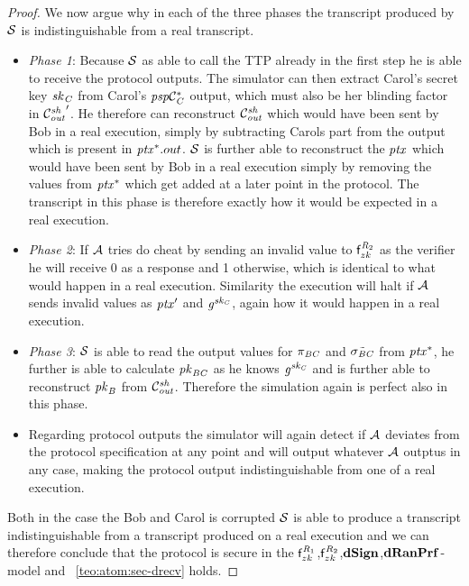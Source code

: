 \begin{proof}
    We now argue why in each of the three phases the transcript produced by $\mathcal{S}$ is indistinguishable from a real transcript.

    \begin{itemize}
        \item \textit{Phase 1}: Because $\mathcal{S}$ as able to call the TTP already in the first step he is able to receive the protocol outputs.
        The simulator can then extract Carol's secret key $\mathit{sk}_{\mathit{C}}$ from Carol's $\mathit{psp}\mathcal{C}_{\mathit{C}}^*$ output, which must also be her blinding factor in ${\mathcal{C}_{\mathit{out}}^{\mathit{sh}}}'$.
        He therefore can reconstruct $\mathcal{C}_{\mathit{out}}^{\mathit{sh}}$ which would have been sent by Bob in a real execution, simply by subtracting Carols part from the output which is present in $\mathit{ptx}^*.out$.
        $\mathcal{S}$ is further able to reconstruct the $\mathit{ptx}$ which would have been sent by Bob in a real execution simply by removing the values from $\mathit{ptx}^*$ which get added at a later point in the protocol.
        The transcript in this phase is therefore exactly how it would be expected in a real execution.
        \item \textit{Phase 2}: If $\mathcal{A}$ tries do cheat by sending an invalid value to $\mathsf{f}^{\mathit{R}_2}_{zk}$ as the verifier he will receive 0 as a response and 1 otherwise, which is identical to what would happen in a real execution.
        Similarity the execution will halt if $\mathcal{A}$ sends invalid values as ${\mathit{ptx}}'$ and $\mathit{g}^{\mathit{sk}_{\mathit{C}}}$, again how it would happen in a real execution.
        \item \textit{Phase 3}: $\mathcal{S}$ is able to read the output values for $\pi_{\mathit{B}\mathit{C}}$ and $\tilde{\sigma_{\mathit{B}\mathit{C}}}$ from $\mathit{ptx}^*$, he further is able to calculate $\mathit{pk}_{\mathit{B}\mathit{C}}$ as he knows $\mathit{g}^{\mathit{sk}_{\mathit{C}}}$ and is further able to reconstruct $\mathit{pk}_{\mathit{B}}$ from $\mathcal{C}_{\mathit{out}}^{\mathit{sh}}$.
        Therefore the simulation again is perfect also in this phase.
        \item Regarding protocol outputs the simulator will again detect if $\mathcal{A}$ deviates from the protocol specification at any point and will output whatever $\mathcal{A}$ outptus in any case, making the protocol output indistinguishable from one of a real execution.
    \end{itemize}

    Both in the case the Bob and Carol is corrupted $\mathcal{S}$ is able to produce a transcript indistinguishable from a transcript produced on a real execution and we can therefore conclude that the protocol is secure in the $\mathsf{f}^{\mathit{R}_1}_{zk}$,$\mathsf{f}^{\mathit{R}_2}_{zk}$,$\mathbf{dSign}$,$\mathbf{dRanPrf}$-model and ~\cref{teo:atom:sec-drecv} holds.
\end{proof}

